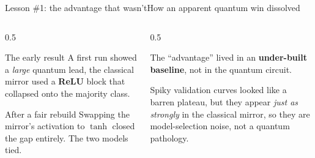 \begin{frame}{Lesson \#1: the advantage that wasn't}{How an apparent quantum win dissolved}
    \begin{columns}[T]
        \begin{column}{0.5\textwidth}
            \begin{alertblock}{The early result}
                A first run showed a \emph{large} quantum lead, the classical
                mirror used a \textbf{ReLU} block that collapsed onto the majority class.
            \end{alertblock}
            \begin{exampleblock}{After a fair rebuild}
                Swapping the mirror's activation to \textbf{$\tanh$} closed the gap
                entirely. The two models tied.
            \end{exampleblock}
        \end{column}
        \begin{column}{0.5\textwidth}
            \begin{callout}[Takeaway]
                The ``advantage'' lived in an \textbf{under-built baseline}, not in
                the quantum circuit.
                \vspace{4pt}

                Spiky validation curves looked like a barren plateau, but they
                appear \emph{just as strongly} in the classical mirror, so they are
                model-selection noise, not a quantum pathology.
            \end{callout}
        \end{column}
    \end{columns}
\end{frame}
